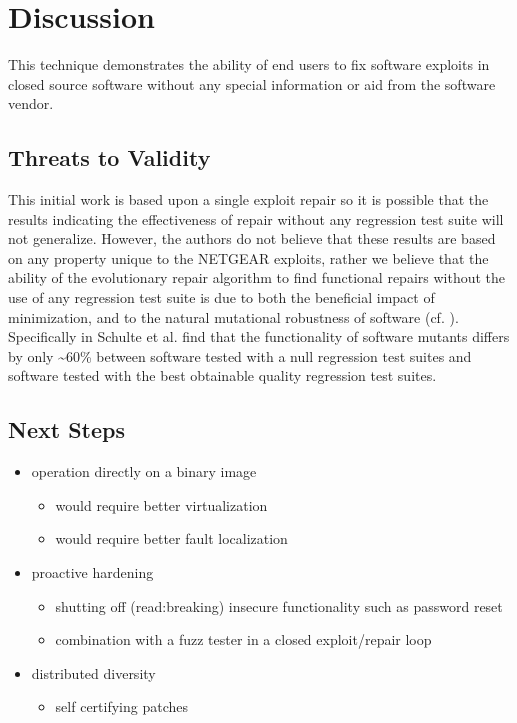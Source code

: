 \documentclass{sigcomm-alternate}
\begin{document}
\section{Discussion}
\label{sec-6}
This technique demonstrates the ability of end users to fix software
exploits in closed source software without any special information or
aid from the software vendor.

\subsection{Threats to Validity}
\label{sec-6-1}
This initial work is based upon a single exploit repair so it is
possible that the results indicating the effectiveness of repair
without any regression test suite will not generalize.  However, the
authors do not believe that these results are based on any property
unique to the NETGEAR exploits, rather we believe that the ability of
the evolutionary repair algorithm to find functional repairs without
the use of any regression test suite is due to both the beneficial
impact of minimization, and to the natural mutational robustness of
software (cf. \cite{schulte2013software}).  Specifically in
\cite{schulte2013software} Schulte et al. find that the functionality of
software mutants differs by only \textasciitilde{}60\% between software tested with a
null regression test suites and software tested with the best
obtainable quality regression test suites.

\subsection{Next Steps}
\label{sec-6-2}

\begin{itemize}
\item operation directly on a binary image
\begin{itemize}
\item would require better virtualization
\item would require better fault localization
\end{itemize}
\item proactive hardening
\begin{itemize}
\item shutting off (read:breaking) insecure functionality such as
password reset
\item combination with a fuzz tester in a closed exploit/repair loop
\end{itemize}
\item distributed diversity
\begin{itemize}
\item self certifying patches
\end{itemize}
\end{itemize}
\end{document}
